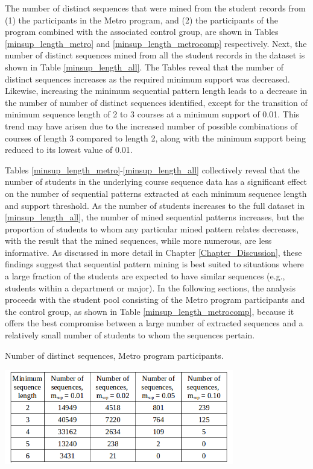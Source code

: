 The number of distinct sequences that were mined from the student records from (1) the participants in the Metro program, and (2) the participants of the program combined with the associated control group, are shown in Tables \ref{minsup_length_metro} and \ref{minsup_length_metrocomp} respectively. Next, the number of distinct sequences mined from all the student records in the dataset is shown in Table \ref{minsup_length_all}.  The Tables reveal that the number of distinct sequences increases as the required minimum support was decreased.  Likewise, increasing the minimum sequential pattern length leads to a decrease in the number of number of distinct sequences identified, except for the transition of minimum sequence length of 2 to 3 courses at a minimum support of 0.01.  This trend may have arisen due to the increased number of possible combinations of courses of length 3 compared to length 2, along with the minimum support being reduced to its lowest value of 0.01. 

Tables \ref{minsup_length_metro}-\ref{minsup_length_all} collectively reveal that the number of students in the underlying course sequence data has a significant effect on the number of sequential patterns extracted at each minimum sequence length and support threshold. As the number of students increases to the full dataset in \ref{minsup_length_all}, the number of mined sequential patterns increases, but the proportion of students to whom any particular mined pattern relates decreases, with the result that the mined sequences, while more numerous, are less informative.  As discussed in more detail in Chapter \ref{Chapter_Discussion}, these findings suggest that sequential pattern mining is best suited to situations where a large fraction of the students are expected to have similar sequences (e.g., students within a department or major).  In the following sections, the analysis proceeds with the student pool consisting of the Metro program participants and the control group, as shown in Table \ref{minsup_length_metrocomp}, because it offers the best compromise between a large number of extracted sequences and a relatively small number of students to whom the sequences pertain.   

\begin{table}[htbp]
\centering
\caption{Number of distinct sequences, Metro program participants.}
\includegraphics[width=0.75\textwidth]{tables/minsup_length_metro.png}
\label{minsup_length_metro}
\end{table}

